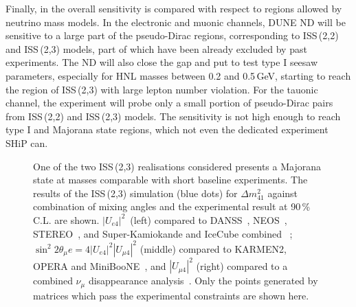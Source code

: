 Finally, in  the overall sensitivity is compared with respect to regions allowed by neutrino mass models.
In the electronic and muonic channels, DUNE ND will be sensitive to a large part of the pseudo-Dirac regions, %
corresponding to ISS\,(2,2) and ISS\,(2,3) models, %
part of which have been already excluded by past experiments.
The ND will also close the gap and put to test type I seesaw parameters, especially for HNL masses between 0.2 and 0.5\,GeV, %
starting to reach the region of ISS\,(2,3) with large lepton number violation.
For the tauonic channel, the experiment will probe only a small portion %
of pseudo-Dirac pairs from ISS\,(2,2) and ISS\,(2,3) models.
The sensitivity is not high enough to reach type I and Majorana state regions, which not even the dedicated experiment SHiP can.

\begin{figure}
	\centering
	{\resizebox{\linewidth}{!}{}}
	\caption[Comparison of ISS(2,3) with short baseline anomalies]%
		{One of the two ISS\,(2,3) realisations considered presents a Majorana state at masses comparable with short baseline experiments.
		The results of the ISS\,(2,3) simulation (blue dots) for $\Delta m_{4 1}^2$ against combination of mixing angles and %
		the experimental result at 90\,\% C.L. are shown.
		$|U_{e 4}|^2$~(left) compared %
		to DANSS~\cite{Alekseev:2018efk}, NEOS~\cite{Ko:2016owz}, STEREO~\cite{AlmazanMolina:2019qul}, %
		and Super-Kamiokande and IceCube combined ~\cite{Dentler:2018sju};
		\mbox{$\sin^2 2\theta{_\mu e} = 4|U_{e 4}|^2|U_{\mu 4}|^2$} (middle) compared to KARMEN2, OPERA and MiniBooNE~\cite{Aguilar-Arevalo:2018gpe},
		and $|U_{\mu 4}|^2$ (right) compared to a combined $\nu_\mu$ disappearance analysis~\cite{Dentler:2018sju}.
		Only the points generated by matrices which pass the experimental constraints are shown here.}
	\label{fig:sblosc}
\end{figure}

